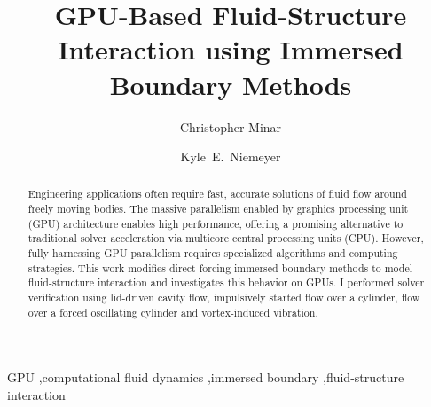 \documentclass[preprint,12pt,5p]{elsarticle}
\begin{document}
\begin{frontmatter}



\title{GPU-Based Fluid-Structure Interaction using Immersed Boundary Methods}


\author[osu]{Christopher Minar}
\author[osu]{Kyle~E.\ Niemeyer}
 
\address[osu]{School of Mechanical, Industrial, and Manufacturing Engineering\\
	Oregon State University, Corvallis, OR 97331, USA}


\begin{abstract}
	Engineering applications often require fast, accurate solutions of fluid flow around freely moving bodies.
	The massive parallelism enabled by graphics processing unit (GPU) architecture enables high performance, offering a promising alternative to traditional solver acceleration via multicore central processing units (CPU).
	However, fully harnessing GPU parallelism requires specialized algorithms and computing strategies.
	This work modifies direct-forcing immersed boundary methods to model fluid-structure interaction and investigates this behavior on GPUs.
	I performed solver verification using lid-driven cavity flow, impulsively started flow over a cylinder, flow over a forced oscillating cylinder and vortex-induced vibration.
\end{abstract}

\begin{keyword}
	GPU \sep computational fluid dynamics \sep immersed boundary \sep fluid-structure interaction
\end{keyword}

\end{frontmatter}
\end{document}

